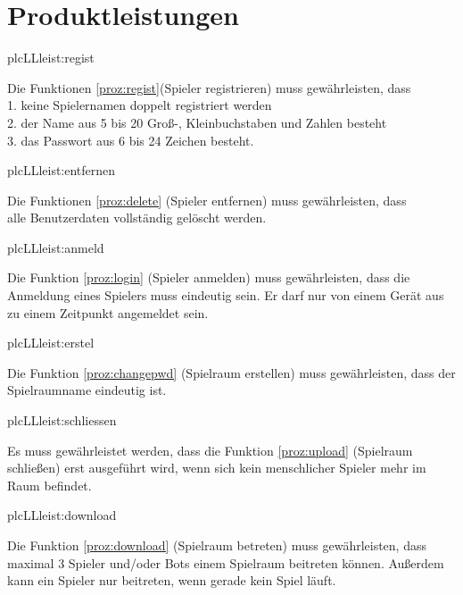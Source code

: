 \chapter{Produktleistungen}

\setcounter{plc}{10}

\begin{description}[leftmargin=5em, style=sameline]

	\begin{lhp}{plc}{LL}{leist:regist}
		\item Die Funktionen \ref{proz:regist}(Spieler registrieren) muss gewährleisten, dass \\
		1. keine Spielernamen doppelt registriert werden \\
		2. der Name aus 5 bis 20 Groß-, Kleinbuchstaben und Zahlen besteht \\
		3. das Passwort aus 6 bis 24 Zeichen besteht.
	\end{lhp}
	
	\begin{lhp}{plc}{LL}{leist:entfernen}
		\item Die Funktionen \ref{proz:delete} (Spieler entfernen) muss gewährleisten, dass \\
		 alle Benutzerdaten vollständig gelöscht werden.
	\end{lhp}
	
	\begin{lhp}{plc}{LL}{leist:anmeld}
		\item Die Funktion \ref{proz:login} (Spieler anmelden) muss gewährleisten, dass die Anmeldung eines Spielers muss eindeutig sein. Er darf nur von einem Gerät aus zu einem Zeitpunkt angemeldet sein.
	\end{lhp}
	
	\begin{lhp}{plc}{LL}{leist:erstel}
		\item Die Funktion \ref{proz:changepwd} (Spielraum erstellen) muss gewährleisten, dass der Spielraumname eindeutig ist.
	\end{lhp}
	
	\begin{lhp}{plc}{LL}{leist:schliessen}
		\item Es muss gewährleistet werden, dass die Funktion \ref{proz:upload} (Spielraum schließen) erst ausgeführt wird, wenn sich kein menschlicher Spieler mehr im Raum befindet.
	\end{lhp}
	
	\begin{lhp}{plc}{LL}{leist:download}
		\item Die Funktion \ref{proz:download} (Spielraum betreten) muss gewährleisten, dass maximal 3 Spieler und/oder Bots einem Spielraum beitreten können. Außerdem kann ein Spieler nur beitreten, wenn gerade kein Spiel läuft.
	\end{lhp}
	

\end{description}
